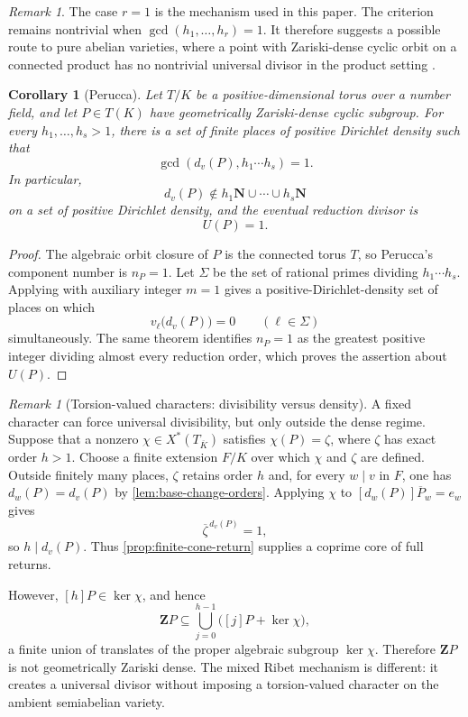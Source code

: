 \documentclass[11pt,letterpaper,reqno]{amsart}
\newtheorem{corollary}[theorem]{Corollary}
\theoremstyle{definition}
\theoremstyle{remark}
\newtheorem{remark}[theorem]{Remark}
\newcommand{\Z}{\mathbf Z}
\newcommand{\N}{\mathbf N}
\begin{document}
\begin{remark}
The case $r=1$ is the mechanism used in this paper.  The criterion remains
nontrivial when $\gcd(h_1,\ldots,h_r)=1$.  It therefore suggests a possible
route to pure abelian varieties, where a point with Zariski-dense cyclic orbit on a connected product has no
nontrivial universal divisor in the product setting \cite{Perucca2009}.
\end{remark}

\begin{corollary}[Perucca]
\label{cor:torus-no-finite-multiples}
Let $T/K$ be a positive-dimensional torus over a number field, and let
$P\in T(K)$ have geometrically Zariski-dense cyclic subgroup.  For every
$h_1,\ldots,h_s>1$, there is a set of finite places of positive Dirichlet
density such that
\[
 \gcd\!\left(d_v(P),h_1\cdots h_s\right)=1.
\]
In particular,
\[
 d_v(P)\notin h_1\N\cup\cdots\cup h_s\N
\]
on a set of positive Dirichlet density, and the eventual reduction divisor is
\[
 U(P)=1.
\]
\end{corollary}

\begin{proof}
The algebraic orbit closure of $P$ is the connected torus $T$, so Perucca's
component number is $n_P=1$.  Let $\Sigma$ be the set of rational primes
dividing $h_1\cdots h_s$.  Applying
\cite[Main Theorem~1]{Perucca2009} with auxiliary integer $m=1$ gives a
positive-Dirichlet-density set of places on which
\[
 v_\ell\bigl(d_v(P)\bigr)=0\qquad(\ell\in\Sigma)
\]
simultaneously.  The same theorem identifies $n_P=1$ as the greatest positive
integer dividing almost every reduction order, which proves the assertion
about $U(P)$.
\end{proof}

\begin{remark}[Torsion-valued characters: divisibility versus density]
\label{rem:torus-torsion-character}
A fixed character can force universal divisibility, but only outside the dense
regime.  Suppose that a nonzero
$\chi\in X^*(T_{\overline K})$ satisfies $\chi(P)=\zeta$, where $\zeta$ has
exact order $h>1$.  Choose a finite extension $F/K$ over which $\chi$ and
$\zeta$ are defined.  Outside finitely many places, $\zeta$ retains order $h$
and, for every $w\mid v$ in $F$, one has
$d_w(P)=d_v(P)$ by \cref{lem:base-change-orders}.  Applying $\chi$ to
$[d_w(P)]\overline P_w=e_w$ gives
\[
 \overline\zeta^{\,d_v(P)}=1,
\]
so $h\mid d_v(P)$.  Thus \cref{prop:finite-cone-return} supplies a coprime
core of full returns.

However, $[h]P\in\ker\chi$, and hence
\[
 \Z P\subseteq
 \bigcup_{j=0}^{h-1}\bigl([j]P+\ker\chi\bigr),
\]
a finite union of translates of the proper algebraic subgroup $\ker\chi$.
Therefore $\Z P$ is not geometrically Zariski dense.  The mixed Ribet
mechanism is different: it creates a universal divisor without imposing a
torsion-valued character on the ambient semiabelian variety.
\end{remark}
\end{document}
